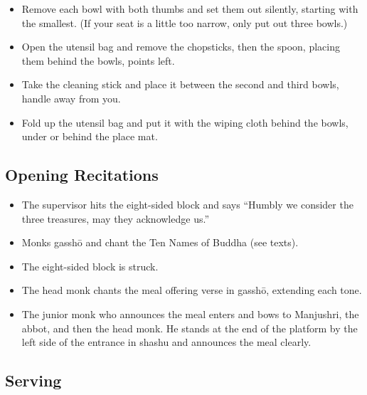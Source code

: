 \documentclass{article}
\begin{document}
\begin{multicols}{2}
\begin{itemize}
  on the wrapping cloth, and then set the bowls on it.
\item Remove each bowl with both thumbs and set them out silently, starting
  with the smallest. (If your seat is a little too narrow, only put out
  three bowls.)
\item Open the utensil bag and remove the chopsticks, then the spoon, placing
them behind the bowls, points left.
\item Take the cleaning stick and place it between the second and third
  bowls, handle away from you.
\item Fold up the utensil bag and put it with the wiping cloth behind
  the bowls, under or behind the place mat.
\end{itemize}

\subsection{Opening Recitations}

\begin{itemize}
\item The supervisor hits the eight-sided block and says ``Humbly
  we consider the three treasures, may they acknowledge us.''
\item Monks gassh\=o and chant the Ten Names of Buddha (see texts).
\item The eight-sided block is struck.
\item The head monk chants the meal offering verse in gassh\=o, extending
each tone.
\item The junior monk who announces the meal enters and bows to Manjushri,
the abbot, and then the head monk. He stands at the end of the platform by
the left side of the entrance in shashu and announces the meal clearly.
\end{itemize}

\subsection{Serving}


\end{multicols}
\end{document}
